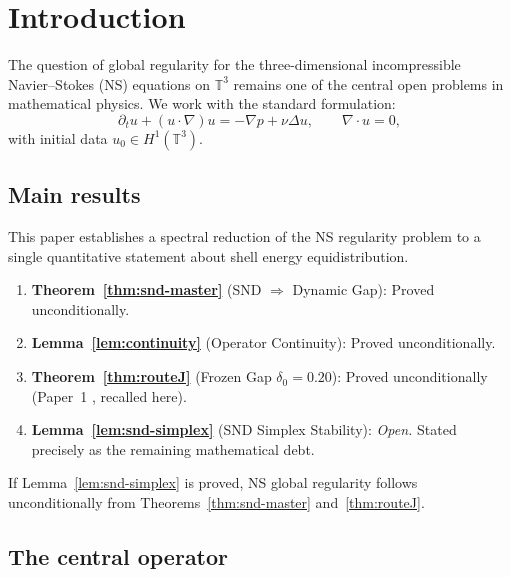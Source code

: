 \documentclass[12pt]{amsart}
\theoremstyle{definition}
\begin{document}
\section{Introduction}

The question of global regularity for the three-dimensional
incompressible Navier--Stokes (NS) equations on $\mathbb T^3$
remains one of the central open problems in mathematical physics.
We work with the standard formulation:
\begin{equation}
\label{eq:ns}
\partial_t u + (u\cdot\nabla)u = -\nabla p + \nu\Delta u,
\qquad \nabla\cdot u=0,
\end{equation}
with initial data $u_0\in H^1(\mathbb T^3)$.

\subsection{Main results}

This paper establishes a spectral reduction of the NS regularity
problem to a single quantitative statement about shell energy
equidistribution.

\begin{tcolorbox}[statusbox,
  title=\textbf{What is proved in this paper}]
\begin{enumerate}
\item \textbf{Theorem~\ref{thm:snd-master}} (SND $\Rightarrow$ Dynamic Gap):
  Proved unconditionally.
\item \textbf{Lemma~\ref{lem:continuity}} (Operator Continuity):
  Proved unconditionally.
\item \textbf{Theorem~\ref{thm:routeJ}} (Frozen Gap $\delta_0=0.20$):
  Proved unconditionally (Paper~1 \cite{Simons2026a}, recalled here).
\item \textbf{Lemma~\ref{lem:snd-simplex}} (SND Simplex Stability):
  \emph{Open.} Stated precisely as the remaining mathematical debt.
\end{enumerate}
If Lemma~\ref{lem:snd-simplex} is proved, NS global regularity follows
unconditionally from Theorems~\ref{thm:snd-master}
and~\ref{thm:routeJ}.
\end{tcolorbox}

\subsection{The central operator}
\end{document}
